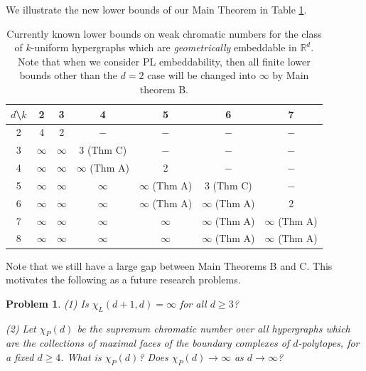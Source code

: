 \documentclass{article}
\newcommand{\RR}{\mathbb{R}}
\newtheorem{pro}[thm]{Problem}
\theoremstyle{definition}
\begin{document}
We illustrate the new lower bounds of our Main Theorem in Table \ref{table_geometric_lower_bound}.
\begin{table}[h!]
	\centering
	\begin{tabular}{|c| c c c c c c |} 
		\hline 
	{$d$\textbackslash$k$} & {2} & {3} & {4} & {5} & {6} & {7} \\ \hline
2  & 4  & 2 & {$-$}  & {$-$} & {$-$} & {$-$}  \\
3  & {$\infty$}  & {$\infty$ \cite{coloring_d-embeddable}} & {3 (Thm C)}  & {$-$} & {$-$} & {$-$}  \\
4  & {$\infty$}  & {$\infty$ \cite{coloring_d-embeddable}} & {$\infty$ (Thm A)}  & 2 & {$-$} & {$-$}  \\ 
5  & {$\infty$}   & {$\infty$} & {$\infty$ \cite{coloring_d-embeddable}}   & {$\infty$ (Thm A)} & {3 (Thm C)} & {$-$}  \\
6  & {$\infty$}  & {$\infty$} & {$\infty$ \cite{coloring_d-embeddable}}  & {$\infty$ (Thm A)} & {$\infty$ (Thm A)} & 2 \\
7  & {$\infty$}  & {$\infty$} & {$\infty$}  & {$\infty$ \cite{coloring_d-embeddable}} & {$\infty$ (Thm A)} & {$\infty$ (Thm A)}\\
8  & {$\infty$}  & {$\infty$} & {$\infty$}  & {$\infty$ \cite{coloring_d-embeddable}} & {$\infty$ (Thm A)}  & {$\infty$ (Thm A)}\\ \hline
	\end{tabular}
	\caption{Currently known lower bounds on weak chromatic numbers for the class of $k$-uniform hypergraphs which are \textit{geometrically} embeddable in $\RR^d$. Note that when we consider PL embeddability, then all finite lower bounds other than the $d=2$ case will be changed into $\infty$ by Main theorem B.}
	\label{table_geometric_lower_bound}
\end{table}

Note that we still have a large gap between Main Theorems B and C. This motivates the following as a future research problems.

\begin{pro} \label{prob:Intro}
(1) Is $\chi_L(d+1, d)= \infty$ for all $d\geq 3$? 

(2) Let $\chi_P(d)$ be the supremum chromatic number over all hypergraphs which are the collections of maximal faces of the boundary complexes of $d$-polytopes, for a fixed $d\geq 4$. What is $\chi_P(d)$? Does $\chi_P(d)\longrightarrow\infty$ as $d\longrightarrow\infty$? 
 
\end{pro}
\end{document}
